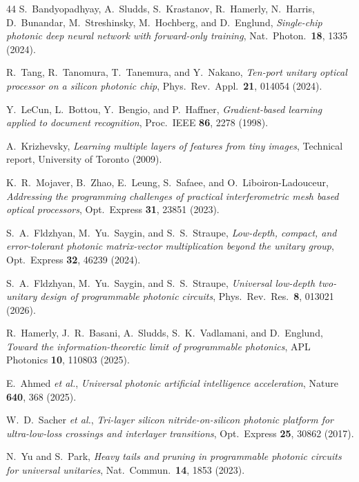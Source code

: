 \documentclass[11pt,a4paper]{article}
\begin{document}
\begin{thebibliography}{44}
S.~Bandyopadhyay, A.~Sludds, S.~Krastanov, R.~Hamerly, N.~Harris, D.~Bunandar, M.~Streshinsky, M.~Hochberg, and D.~Englund,
\textit{Single-chip photonic deep neural network with forward-only training},
Nat.\ Photon.\ \textbf{18}, 1335 (2024).

R.~Tang, R.~Tanomura, T.~Tanemura, and Y.~Nakano,
\textit{Ten-port unitary optical processor on a silicon photonic chip},
Phys.\ Rev.\ Appl.\ \textbf{21}, 014054 (2024).

Y.~LeCun, L.~Bottou, Y.~Bengio, and P.~Haffner,
\textit{Gradient-based learning applied to document recognition},
Proc.\ IEEE \textbf{86}, 2278 (1998).

A.~Krizhevsky,
\textit{Learning multiple layers of features from tiny images},
Technical report, University of Toronto (2009).

K.~R.~Mojaver, B.~Zhao, E.~Leung, S.~Safaee, and O.~Liboiron-Ladouceur,
\textit{Addressing the programming challenges of practical interferometric mesh based optical processors},
Opt.\ Express \textbf{31}, 23851 (2023).

S.~A.~Fldzhyan, M.~Yu.~Saygin, and S.~S.~Straupe,
\textit{Low-depth, compact, and error-tolerant photonic matrix-vector multiplication beyond the unitary group},
Opt.\ Express \textbf{32}, 46239 (2024).

S.~A.~Fldzhyan, M.~Yu.~Saygin, and S.~S.~Straupe,
\textit{Universal low-depth two-unitary design of programmable photonic circuits},
Phys.\ Rev.\ Res.\ \textbf{8}, 013021 (2026).

R.~Hamerly, J.~R.~Basani, A.~Sludds, S.~K.~Vadlamani, and D.~Englund,
\textit{Toward the information-theoretic limit of programmable photonics},
APL Photonics \textbf{10}, 110803 (2025).

E.~Ahmed \textit{et al.},
\textit{Universal photonic artificial intelligence acceleration},
Nature \textbf{640}, 368 (2025).

W.~D.~Sacher \textit{et al.},
\textit{Tri-layer silicon nitride-on-silicon photonic platform for ultra-low-loss crossings and interlayer transitions},
Opt.\ Express \textbf{25}, 30862 (2017).

N.~Yu and S.~Park,
\textit{Heavy tails and pruning in programmable photonic circuits for universal unitaries},
Nat.\ Commun.\ \textbf{14}, 1853 (2023).


\end{thebibliography}
\end{document}
